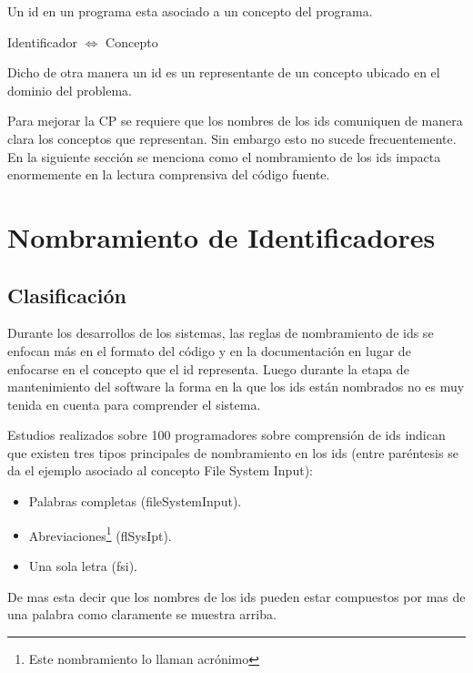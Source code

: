 \documentclass[12pt]{report}
\begin{document}
Un id en un programa esta asociado a un concepto del programa. 

\begin{center}
\textsf{Identificador $\Leftrightarrow$ Concepto}
\end{center}

Dicho de otra manera un id es un representante de un concepto ubicado en el dominio del problema\cite{DFPM05,DMDJ13}.%

Para mejorar la CP se requiere que los nombres de los ids comuniquen de manera clara los conceptos que representan\cite{DCHD06}. Sin embargo esto no sucede frecuentemente. En la siguiente sección se menciona como el nombramiento de los ids impacta enormemente en la lectura comprensiva del código fuente. 


\pagebreak
\section{Nombramiento de Identificadores}

\subsection{Clasificación}
Durante los desarrollos de los sistemas, las reglas de nombramiento de ids se enfocan más en el formato del código y en la documentación en lugar de enfocarse en el concepto que el id representa. Luego durante la etapa de mantenimiento del software la forma en la que los ids están nombrados no es muy tenida en cuenta para comprender el sistema.

Estudios realizados sobre 100 programadores\cite{DCHD06} sobre comprensión de ids indican que existen tres tipos principales de nombramiento en los ids (entre paréntesis se da el ejemplo asociado al concepto \textsf{File System Input}): 

\begin{itemize}
\itemsep0em%
\item Palabras completas (\textsf{fileSystemInput}).
\item Abreviaciones\footnote[1]{Este nombramiento lo llaman acrónimo} (\textsf{flSysIpt}).
\item Una sola letra (\textsf{fsi}). 
\end{itemize}

De mas esta decir que los nombres de los ids pueden estar compuestos por mas de una palabra como claramente se muestra arriba.
\end{document}
